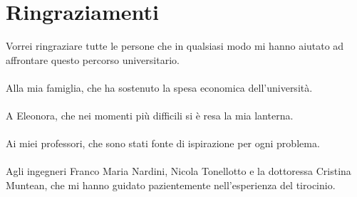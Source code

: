 \chapter*{Ringraziamenti}

Vorrei ringraziare tutte le persone che in qualsiasi modo mi hanno aiutato
ad affrontare questo percorso universitario.
\\
\\
Alla mia famiglia, che ha sostenuto la spesa economica dell'università.
\\
\\
A Eleonora, che nei momenti più difficili si è resa la mia lanterna.
\\
\\
Ai miei professori, che sono stati fonte di ispirazione per ogni
problema.
\\
\\
Agli ingegneri Franco Maria Nardini, Nicola Tonellotto e la dottoressa
Cristina Muntean, che mi hanno guidato pazientemente nell'esperienza
del tirocinio.
